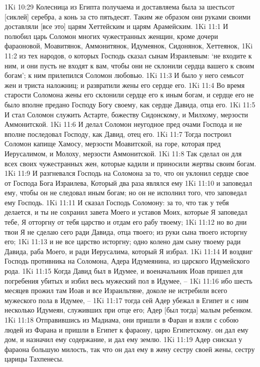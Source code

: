 1Ki 10:29  Колесница из Египта получаема и доставляема была за шестьсот [сиклей] серебра, а конь за сто пятьдесят. Таким же образом они руками своими доставляли [все это] царям Хеттейским и царям Арамейским.
1Ki 11:1  И полюбил царь Соломон многих чужестранных женщин, кроме дочери фараоновой, Моавитянок, Аммонитянок, Идумеянок, Сидонянок, Хеттеянок,
1Ki 11:2  из тех народов, о которых Господь сказал сынам Израилевым: `не входите к ним, и они пусть не входят к вам, чтобы они не склонили сердца вашего к своим богам'; к ним прилепился Соломон любовью.
1Ki 11:3  И было у него семьсот жен и триста наложниц; и развратили жены его сердце его.
1Ki 11:4  Во время старости Соломона жены его склонили сердце его к иным богам, и сердце его не было вполне предано Господу Богу своему, как сердце Давида, отца его.
1Ki 11:5  И стал Соломон служить Астарте, божеству Сидонскому, и Милхому, мерзости Аммонитской.
1Ki 11:6  И делал Соломон неугодное пред очами Господа и не вполне последовал Господу, как Давид, отец его.
1Ki 11:7  Тогда построил Соломон капище Хамосу, мерзости Моавитской, на горе, которая пред Иерусалимом, и Молоху, мерзости Аммонитской.
1Ki 11:8  Так сделал он для всех своих чужестранных жен, которые кадили и приносили жертвы своим богам.
1Ki 11:9  И разгневался Господь на Соломона за то, что он уклонил сердце свое от Господа Бога Израилева, Который два раза являлся ему
1Ki 11:10  и заповедал ему, чтобы он не следовал иным богам; но он не исполнил того, что заповедал ему Господь.
1Ki 11:11  И сказал Господь Соломону: за то, что так у тебя делается, и ты не сохранил завета Моего и уставов Моих, которые Я заповедал тебе, Я отторгну от тебя царство и отдам его рабу твоему;
1Ki 11:12  но во дни твои Я не сделаю сего ради Давида, отца твоего; из руки сына твоего исторгну его;
1Ki 11:13  и не все царство исторгну; одно колено дам сыну твоему ради Давида, раба Моего, и ради Иерусалима, который Я избрал.
1Ki 11:14  И воздвиг Господь противника на Соломона, Адера Идумеянина, из царского Идумейского рода.
1Ki 11:15  Когда Давид был в Идумее, и военачальник Иоав пришел для погребения убитых и избил весь мужеский пол в Идумее, --
1Ki 11:16  ибо шесть месяцев прожил там Иоав и все Израильтяне, доколе не истребили всего мужеского пола в Идумее, --
1Ki 11:17  тогда сей Адер убежал в Египет и с ним несколько Идумеян, служивших при отце его; Адер [был тогда] малым ребенком.
1Ki 11:18  Отправившись из Мадиама, они пришли в Фаран и взяли с собою людей из Фарана и пришли в Египет к фараону, царю Египетскому. он дал ему дом, и назначил ему содержание, и дал ему землю.
1Ki 11:19  Адер снискал у фараона большую милость, так что он дал ему в жену сестру своей жены, сестру царицы Тахпенесы.
